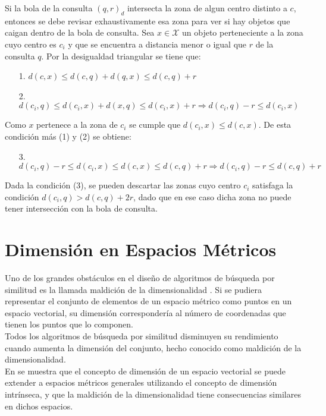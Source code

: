 Si la bola de la consulta $(q, r)_d$ intersecta la zona de algun centro distinto a $c$, entonces se debe revisar exhaustivamente esa zona para ver si hay objetos que caigan dentro de la bola de consulta. Sea $x \in \mathcal{X}$ un objeto perteneciente a la zona cuyo centro es $c_i$ y que se encuentra a distancia menor o igual que $r$ de la consulta $q$. Por la desigualdad triangular se tiene que:

\begin{enumerate}
\item [1.] $d(c,x) \leq d(c,q) + d(q,x) \leq d(c,q) + r$
\item [2.]$d(c_i,q) \leq d(c_i,x) + d(x,q) \leq d(c_i,x) + r  \Rightarrow d(c_i,q) - r \leq d(c_i,x)$
\end{enumerate}

Como $x$ pertenece a la zona de $c_i$ se cumple que  $d(c_i,x) \leq d(c,x)$. De esta condici\'on m\'as (1) y (2) se obtiene:

\begin{enumerate}
\item [3.] $d(c_i,q) - r \leq d(c_i,x) \leq d(c,x) \leq d(c,q) + r \Rightarrow d(c_i,q) - r \leq d(c,q) + r$
\end{enumerate}

Dada la condici\'on (3), se pueden descartar las zonas cuyo centro $c_i$ satisfaga la condici\'on $d(c_i,q)  > d(c,q) +2r$, dado que en ese caso dicha zona no puede tener intersecci\'on con la bola de consulta.

\section{Dimensi\'on en Espacios M\'etricos}

Uno de los grandes obst\'aculos en el dise\~no de algoritmos de b\'usqueda por similitud es la llamada maldici\'on de la dimensionalidad \cite{oursurvey}. Si se pudiera representar el conjunto de elementos de un espacio m\'etrico como puntos en un espacio vectorial, su dimensi\'on corresponder\'ia al n\'umero de coordenadas que tienen los puntos que lo componen. \\

Todos los algoritmos de b\'usqueda por similitud disminuyen su rendimiento cuando aumenta la  dimensi\'on del conjunto, hecho conocido como maldici\'on de la dimensionalidad. \\

En \cite{oursurvey} se muestra que el concepto de dimensi\'on de un espacio vectorial se puede extender a espacios m\'etricos generales utilizando el concepto de dimensi\'on intr\'inseca, y que la maldici\'on de la dimensionalidad tiene consecuencias similares en dichos espacios.\\

